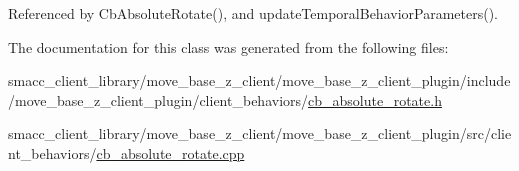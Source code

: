 Referenced by Cb\+Absolute\+Rotate(), and update\+Temporal\+Behavior\+Parameters().



The documentation for this class was generated from the following files\+:\begin{DoxyCompactItemize}
\item 
smacc\+\_\+client\+\_\+library/move\+\_\+base\+\_\+z\+\_\+client/move\+\_\+base\+\_\+z\+\_\+client\+\_\+plugin/include/move\+\_\+base\+\_\+z\+\_\+client\+\_\+plugin/client\+\_\+behaviors/\hyperlink{cb__absolute__rotate_8h}{cb\+\_\+absolute\+\_\+rotate.\+h}\item 
smacc\+\_\+client\+\_\+library/move\+\_\+base\+\_\+z\+\_\+client/move\+\_\+base\+\_\+z\+\_\+client\+\_\+plugin/src/client\+\_\+behaviors/\hyperlink{cb__absolute__rotate_8cpp}{cb\+\_\+absolute\+\_\+rotate.\+cpp}\end{DoxyCompactItemize}
